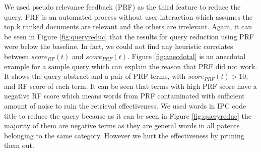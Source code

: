 We used pseudo relevance feedback (PRF) as the third feature to reduce the query. PRF is an automated process without user interaction which assumes the top k ranked documents are relevant and the others are irrelevant. Again, it can be seen in Figure \ref{fig:queryreduc} that the results for query reduction using PRF were below the baseline. In fact, we could not find any heuristic correlates between  $ score_{RF}(t)$ and $ score_{PRF}(t)$. Figure \ref{fig:anecdotal} is an anecdotal example for a sample query which can explain the reason that PRF did not work. It shows the query abstract and a pair of PRF terms, with $ score_{PRF}(t)>10 $, and RF score of each term. It can be seen that terms with high PRF score have a negative RF score which means words from PRF contaminated with sufficient amount of noise to ruin the retrieval effectiveness. 
We used words in IPC code title to reduce the query because as it can be seen in Figure \ref{fig:queryreduc} the majority of them are negative terms as they are general words in all patents belonging to the same category. However we hurt the effectiveness by pruning them out.
